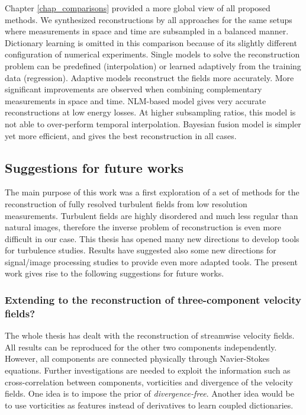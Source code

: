 Chapter \ref{chap_comparisons} provided a more global view of all proposed methods. We synthesized reconstructions by all approaches for the same setups where measurements in space and time are subsampled in a balanced manner. Dictionary learning is omitted in this comparison because of its slightly different configuration of numerical experiments. Single models to solve the reconstruction problem can be predefined (interpolation) or learned adaptively from the training data (regression). Adaptive models reconstruct the fields more accurately. More significant improvements are observed when combining complementary measurements in space and time. NLM-based model gives very accurate reconstructions at low energy losses. At higher subsampling ratios, this model is not able to over-perform temporal interpolation. Bayesian fusion model is simpler yet more efficient, and gives the best reconstruction in all cases. 

\subsection{Suggestions for future works}
The main purpose of this work was a first exploration of a set of methods for the reconstruction of fully resolved turbulent fields from low resolution measurements. Turbulent fields are highly disordered and much less regular than natural images, therefore the inverse problem of reconstruction is even more difficult in our case. This thesis has opened many new directions to develop tools for turbulence studies. Results have suggested also some new directions for signal/image processing studies to provide even more adapted tools. The present work gives rise to the following suggestions for future works.

\subsubsection*{Extending to the reconstruction of three-component velocity fields?} 
The whole thesis has dealt with the reconstruction of streamwise velocity fields. All results can be reproduced for the other two components independently. However, all components are connected physically through Navier-Stokes equations. Further investigations are needed to exploit the information such as cross-correlation between components, vorticities and divergence of the velocity fields. One idea is to impose the prior of \textit{divergence-free}. Another idea would be to use vorticities as features instead of derivatives to learn coupled dictionaries.  

